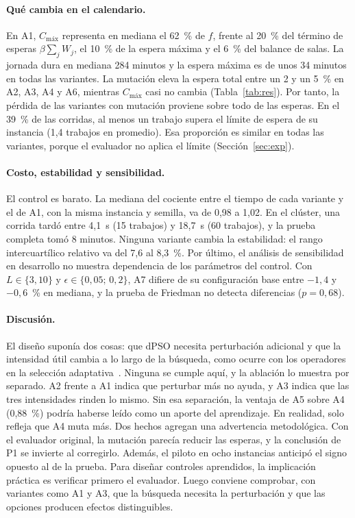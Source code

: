 \documentclass[10pt,a4paper]{article}
\newcommand{\Cmax}{C_{\text{máx}}}
\newcommand{\dc}{{,}}%
\begin{document}
\paragraph{Qué cambia en el calendario.}
En A1, $\Cmax$ representa en mediana el 62~\% de $f$, frente al 20~\% del término de esperas
$\beta\sum_j W_j$, el 10~\% de la espera máxima y el 6~\% del balance de salas. La jornada
dura en mediana 284 minutos y la espera máxima es de unos 34 minutos en todas las variantes.
La mutación eleva la espera total entre un 2 y un 5~\% en A2, A3, A4 y A6, mientras $\Cmax$
casi no cambia (Tabla~\ref{tab:res}). Por tanto, la pérdida de las variantes con mutación
proviene sobre todo de las esperas. En el 39~\% de las corridas, al menos un trabajo supera el
límite de espera de su instancia (1,4 trabajos en promedio). Esa proporción es similar en todas
las variantes, porque el evaluador no aplica el límite (Sección~\ref{sec:exp}).

\paragraph{Costo, estabilidad y sensibilidad.}
El control es barato. La mediana del cociente entre el tiempo de cada variante y el de A1, con la
misma instancia y semilla, va de 0,98 a 1,02. En el clúster, una corrida tardó entre 4,1~s
(15 trabajos) y 18,7~s (60 trabajos), y la prueba completa tomó 8 minutos. Ninguna variante
cambia la estabilidad: el rango intercuartílico relativo va del 7,6 al 8,3~\%. Por último, el
análisis de sensibilidad en desarrollo no muestra dependencia de los parámetros del control. Con
$L\in\{3,10\}$ y $\epsilon\in\{0\dc05;\,0\dc2\}$, A7 difiere de su configuración base entre
$-1\dc4$ y $-0\dc6$~\% en mediana, y la prueba de Friedman no detecta diferencias ($p=0\dc68$).

\paragraph{Discusión.}
El diseño suponía dos cosas: que dPSO necesita perturbación adicional y que la intensidad útil
cambia a lo largo de la búsqueda, como ocurre con los operadores en la selección
adaptativa~\cite{fialho2010}. Ninguna se cumple aquí, y la ablación lo muestra por separado. A2
frente a A1 indica que perturbar más no ayuda, y A3 indica que las tres intensidades rinden lo
mismo. Sin esa separación, la ventaja de A5 sobre A4 (0,88~\%) podría haberse leído como un
aporte del aprendizaje. En realidad, solo refleja que A4 muta más. Dos hechos agregan una
advertencia metodológica. Con el evaluador original, la mutación parecía reducir las esperas, y
la conclusión de P1 se invierte al corregirlo. Además, el piloto en ocho instancias anticipó
el signo opuesto al de la prueba. Para diseñar controles aprendidos, la implicación práctica es
verificar primero el evaluador. Luego conviene comprobar, con variantes como A1 y A3, que la
búsqueda necesita la perturbación y que las opciones producen efectos distinguibles.
\end{document}
